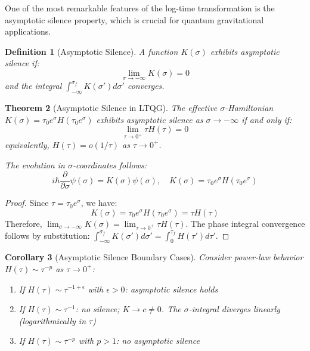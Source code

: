 \documentclass[11pt,a4paper]{article}
\newtheorem{theorem}{Theorem}[section]
\newtheorem{corollary}[theorem]{Corollary}
\newtheorem{definition}[theorem]{Definition}
\begin{document}
One of the most remarkable features of the log-time transformation is the asymptotic silence property, which is crucial for quantum gravitational applications.

\begin{definition}[Asymptotic Silence]
A function $K(\sigma)$ exhibits asymptotic silence if:
\begin{equation}
\lim_{\sigma \to -\infty} K(\sigma) = 0
\end{equation}
and the integral $\int_{-\infty}^{\sigma_f} K(\sigma') d\sigma'$ converges.
\end{definition}

\begin{theorem}[Asymptotic Silence in LTQG]
The effective $\sigma$-Hamiltonian $K(\sigma) = \tau_0 e^{\sigma} H(\tau_0 e^{\sigma})$ exhibits asymptotic silence as $\sigma \to -\infty$ if and only if:
\begin{equation}
\lim_{\tau \to 0^+} \tau H(\tau) = 0
\end{equation}
equivalently, $H(\tau) = o(1/\tau)$ as $\tau \to 0^+$.

The evolution in $\sigma$-coordinates follows:
\begin{equation}
i\hbar \frac{\partial}{\partial \sigma} \psi(\sigma) = K(\sigma) \psi(\sigma), \quad K(\sigma) = \tau_0 e^{\sigma} H(\tau_0 e^{\sigma})
\end{equation}
\end{theorem}

\begin{proof}
Since $\tau = \tau_0 e^{\sigma}$, we have:
\begin{equation}
K(\sigma) = \tau_0 e^{\sigma} H(\tau_0 e^{\sigma}) = \tau H(\tau)
\end{equation}
Therefore, $\lim_{\sigma \to -\infty} K(\sigma) = \lim_{\tau \to 0^+} \tau H(\tau)$.
The phase integral convergence follows by substitution: $\int_{-\infty}^{\sigma_f} K(\sigma') d\sigma' = \int_0^{\tau_f} H(\tau') d\tau'$.
\end{proof}

\begin{corollary}[Asymptotic Silence Boundary Cases]
    \par
Consider power-law behavior $H(\tau) \sim \tau^{-p}$ as $\tau \to 0^+$:
\begin{enumerate}
\item If $H(\tau) \sim \tau^{-1+\epsilon}$ with $\epsilon > 0$: asymptotic silence holds
\item If $H(\tau) \sim \tau^{-1}$: no silence; $K \to c \neq 0$. The $\sigma$-integral diverges linearly (logarithmically in $\tau$)
\item If $H(\tau) \sim \tau^{-p}$ with $p > 1$: no asymptotic silence
\end{enumerate}
\end{corollary}
\end{document}
